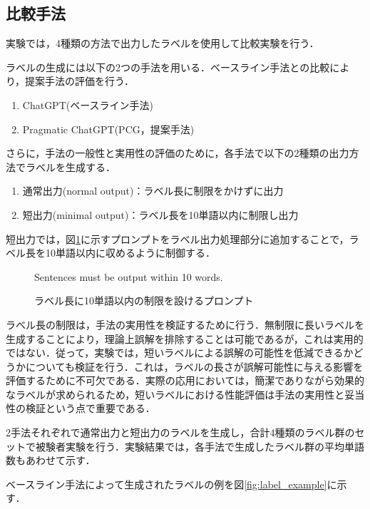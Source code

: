 \documentclass[a4paper,11pt]{jreport}
\begin{document}
\subsection{比較手法}

実験では，4種類の方法で出力したラベルを使用して比較実験を行う．

ラベルの生成には以下の2つの手法を用いる．ベースライン手法との比較により，提案手法の評価を行う．
\begin{enumerate}
    \item ChatGPT(ベースライン手法)
    \item Pragmatic ChatGPT(PCG，提案手法)
\end{enumerate}

さらに，手法の一般性と実用性の評価のために，各手法で以下の2種類の出力方法でラベルを生成する．
\begin{enumerate}
  \item 通常出力(normal output)：ラベル長に制限をかけずに出力
  \item 短出力(minimal output)：ラベル長を10単語以内に制限し出力
\end{enumerate}

短出力では，図\ref{fig:limiting_prompt}に示すプロンプトをラベル出力処理部分に追加することで，ラベル長を10単語以内に収めるように制御する．

\begin{figure}[H]
\begin{mdframed}[linewidth=1pt]
Sentences must be output within 10 words.
\end{mdframed}
\caption{ラベル長に10単語以内の制限を設けるプロンプト}
\label{fig:limiting_prompt}
\end{figure}


ラベル長の制限は，手法の実用性を検証するために行う．無制限に長いラベルを生成することにより，理論上誤解を排除することは可能であるが，これは実用的ではない．従って，実験では，短いラベルによる誤解の可能性を低減できるかどうかについても検証を行う．これは，ラベルの長さが誤解可能性に与える影響を評価するために不可欠である．実際の応用においては，簡潔でありながら効果的なラベルが求められるため，短いラベルにおける性能評価は手法の実用性と妥当性の検証という点で重要である．

2手法それぞれで通常出力と短出力のラベルを生成し，合計4種類のラベル群のセットで被験者実験を行う．実験結果では，各手法で生成したラベル群の平均単語数もあわせて示す．

ベースライン手法によって生成されたラベルの例を図\ref{fig:label_example}に示す．
\end{document}
